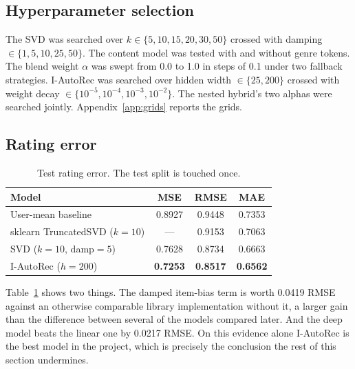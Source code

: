 \documentclass[10pt,twocolumn,letterpaper]{article}
\begin{document}
\subsection{Hyperparameter selection}
The SVD was searched over $k \in \{5,10,15,20,30,50\}$ crossed with damping
$\in \{1,5,10,25,50\}$. The content model was tested with and without genre
tokens. The blend weight $\alpha$ was swept from 0.0 to 1.0 in steps of 0.1
under two fallback strategies. I-AutoRec was searched over hidden width
$\in \{25,200\}$ crossed with weight decay
$\in \{10^{-5},10^{-4},10^{-3},10^{-2}\}$. The nested hybrid's two alphas were
searched jointly. Appendix~\ref{app:grids} reports the grids.

\subsection{Rating error}
\begin{table}[t]\centering\small
\begin{tabular}{lccc}
\toprule
Model & MSE & RMSE & MAE \\
\midrule
User-mean baseline              & 0.8927 & 0.9448 & 0.7353 \\
sklearn TruncatedSVD ($k{=}10$) & ---    & 0.9153 & 0.7063 \\
SVD ($k{=}10$, damp${=}5$)      & 0.7628 & 0.8734 & 0.6663 \\
I-AutoRec ($h{=}200$)           & \textbf{0.7253} & \textbf{0.8517} & \textbf{0.6562} \\
\bottomrule
\end{tabular}
\caption{Test rating error. The test split is touched once.}
\label{tab:rmse}
\end{table}

Table~\ref{tab:rmse} shows two things. The damped item-bias term is worth
0.0419 RMSE against an otherwise comparable library implementation without it,
a larger gain than the difference between several of the models compared
later. And the deep model beats the linear one by 0.0217 RMSE. On this
evidence alone I-AutoRec is the best model in the project, which is precisely
the conclusion the rest of this section undermines.
\end{document}
